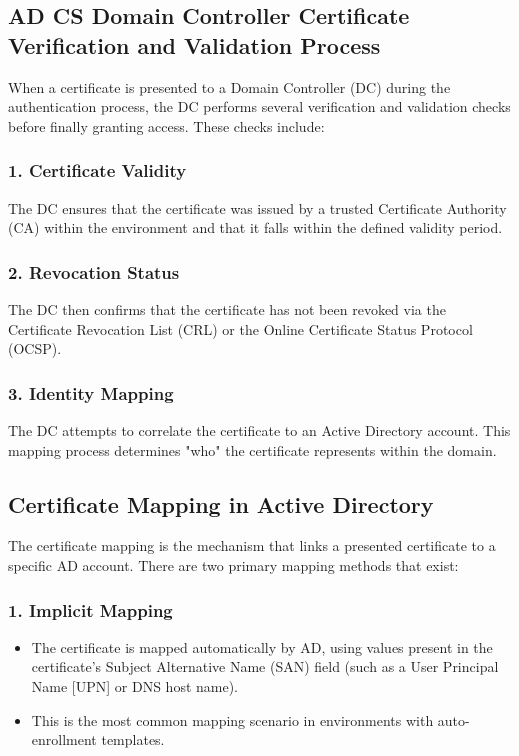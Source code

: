 {\subsection{AD CS Domain Controller Certificate Verification and Validation Process}
When a certificate is presented to a Domain Controller (DC) during the authentication process, the DC performs several verification and validation checks before finally granting access. These checks include:
\subsubsection{1. Certificate Validity}
The DC ensures that the certificate was issued by a trusted Certificate Authority (CA) within the environment and that it falls within the defined validity period.
\subsubsection{2. Revocation Status}
The DC then confirms that the certificate has not been revoked via the Certificate Revocation List (CRL) or the Online Certificate Status Protocol (OCSP).
\subsubsection{3. Identity Mapping}
The DC attempts to correlate the certificate to an Active Directory account. This mapping process determines "who" the certificate represents within the domain.

\subsection{Certificate Mapping in Active Directory}
The certificate mapping is the mechanism that links a presented certificate to a specific AD account. There are two primary mapping methods that exist:
\subsubsection{1. Implicit Mapping}
\begin{itemize}
    \item The certificate is mapped automatically by AD, using values present in the certificate's Subject Alternative Name (SAN) field (such as a User Principal Name [UPN] or DNS host name).
    \item This is the most common mapping scenario in environments with auto-enrollment templates.
\end{itemize}
}
